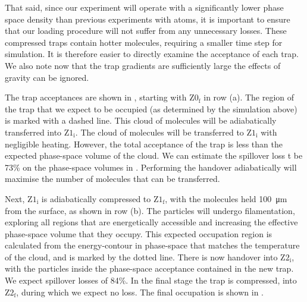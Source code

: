 That said, since our experiment will operate with a significantly lower phase
space density than previous experiments with atoms, it is important to ensure
that our loading procedure will not suffer from any unnecessary losses. These
compressed traps contain hotter molecules, requiring a smaller time step for
simulation. It is therefore easier to directly examine the acceptance of each
trap. We also note now that the trap gradients are sufficiently large the
effects of gravity can be ignored.

The trap acceptances are shown in ,
starting with $\mathrm{Z0_f}$ in row (a). The region of the trap that we expect
to be occupied (as determined by the simulation above) is marked with a dashed
line.  This cloud of molecules will be adiabatically transferred into
$\mathrm{Z1_i}$.
%
The cloud of molecules will be transferred to $\mathrm{Z1_i}$ with negligible
heating. However, the total acceptance of the trap is less than the expected
phase-space volume of the cloud. We can estimate the spillover loss t be 73\%
on the phase-space volumes in
. Performing the handover adiabatically
will maximise the number of molecules that can be transferred.

Next, $\mathrm{Z1_i}$ is adiabatically compressed to $\mathrm{Z1_f}$, with the
molecules held \SI{100}{\micro\meter} from the surface, as shown in row (b).
The particles will undergo filamentation, exploring all regions that are
energetically accessible and increasing the effective phase-space volume that
they occupy. This expected occupation region is calculated from the
energy-contour in phase-space that matches the temperature of the cloud, and is
marked by the dotted line. There is now handover into $\mathrm{Z2_i}$, with the
particles inside the phase-space acceptance contained in the new trap. We
expect spillover losses of 84\%. In the final
stage the trap is compressed, into $\mathrm{Z2_f}$, during which we expect no
loss. The final occupation is shown in
.

